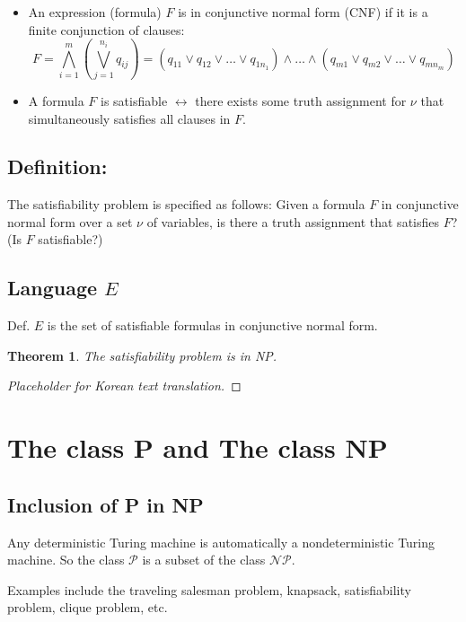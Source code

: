 \documentclass[12pt,openany]{book}
\newtheorem{theorem}{Theorem}[chapter]
\theoremstyle{definition}
\begin{document}
	\begin{itemize}
		\item An expression (formula) \( F \) is in conjunctive normal form (CNF) if it is a finite conjunction of clauses:
		\[
		F = \bigwedge_{i=1}^{m} \left( \bigvee_{j=1}^{n_i} q_{ij} \right) = (q_{11} \lor q_{12} \lor \ldots \lor q_{1n_1}) \land \ldots \land (q_{m1} \lor q_{m2} \lor \ldots \lor q_{mn_m})
		\]
		\item A formula \( F \) is satisfiable \( \leftrightarrow \) there exists some truth assignment for \( \nu \) that simultaneously satisfies all clauses in \( F \).
	\end{itemize}
	
	\subsection*{Definition:}
	The satisfiability problem is specified as follows:
	Given a formula \( F \) in conjunctive normal form over a set \( \nu \) of variables, is there a truth assignment that satisfies \( F \)? (Is \( F \) satisfiable?)
	
	\subsection*{Language \( E \)}
	Def. \( E \) is the set of satisfiable formulas in conjunctive normal form.
	
	\begin{theorem}
		The satisfiability problem is in NP.
	\end{theorem}
	\begin{proof}
		[Placeholder for Korean text translation]
	\end{proof}
	
	\section{The class P and The class NP}
	
	\subsection*{Inclusion of P in NP}
	Any deterministic Turing machine is automatically a nondeterministic Turing machine. So the class \( \mathcal{P} \) is a subset of the class \( \mathcal{NP} \).
	
	Examples include the traveling salesman problem, knapsack, satisfiability problem, clique problem, etc.
	
\end{document}
